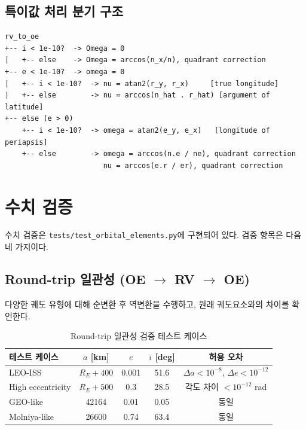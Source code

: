 \documentclass[11pt]{article}
\begin{document}
\subsection{특이값 처리 분기 구조}

\begin{lstlisting}
rv_to_oe
+-- i < 1e-10?  -> Omega = 0
|   +-- else    -> Omega = arccos(n_x/n), quadrant correction
+-- e < 1e-10?  -> omega = 0
|   +-- i < 1e-10?  -> nu = atan2(r_y, r_x)     [true longitude]
|   +-- else        -> nu = arccos(n_hat . r_hat) [argument of latitude]
+-- else (e > 0)
    +-- i < 1e-10?  -> omega = atan2(e_y, e_x)   [longitude of periapsis]
    +-- else        -> omega = arccos(n.e / ne), quadrant correction
                       nu = arccos(e.r / er), quadrant correction
\end{lstlisting}

\section{수치 검증}

수치 검증은 \texttt{tests/test\_orbital\_elements.py}에 구현되어 있다. 검증 항목은 다음 네 가지이다.

\subsection{Round-trip 일관성 (OE $\to$ RV $\to$ OE)}

다양한 궤도 유형에 대해 순변환 후 역변환을 수행하고, 원래 궤도요소와의 차이를 확인한다.

\begin{table}[h]
\centering
\begin{tabular}{lcccc}
\toprule
테스트 케이스 & $a$ [km] & $e$ & $i$ [deg] & 허용 오차 \\
\midrule
LEO-ISS & $R_E + 400$ & 0.001 & 51.6 & $\Delta a < 10^{-8}$, $\Delta e < 10^{-12}$ \\
High eccentricity & $R_E + 500$ & 0.3 & 28.5 & 각도 차이 $< 10^{-12}$ rad \\
GEO-like & 42164 & 0.01 & 0.05 & 동일 \\
Molniya-like & 26600 & 0.74 & 63.4 & 동일 \\
\bottomrule
\end{tabular}
\caption{Round-trip 일관성 검증 테스트 케이스}
\label{tab:roundtrip_cases}
\end{table}
\end{document}
